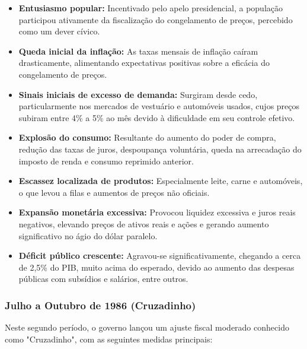 \documentclass[a4paper,12pt]{article}[abntex2]
\begin{document}
\begin{itemize}
    \item \textbf{Entusiasmo popular:} Incentivado pelo apelo presidencial, a população participou ativamente da fiscalização do congelamento de preços, percebido como um dever cívico.
    \item \textbf{Queda inicial da inflação:} As taxas mensais de inflação caíram drasticamente, alimentando expectativas positivas sobre a eficácia do congelamento de preços.
    \item \textbf{Sinais iniciais de excesso de demanda:} Surgiram desde cedo, particularmente nos mercados de vestuário e automóveis usados, cujos preços subiram entre 4\% a 5\% ao mês devido à dificuldade em seu controle efetivo.
    \item \textbf{Explosão do consumo:} Resultante do aumento do poder de compra, redução das taxas de juros, despoupança voluntária, queda na arrecadação do imposto de renda e consumo reprimido anterior.
    \item \textbf{Escassez localizada de produtos:} Especialmente leite, carne e automóveis, o que levou a filas e aumentos de preços não oficiais.
    \item \textbf{Expansão monetária excessiva:} Provocou liquidez excessiva e juros reais negativos, elevando preços de ativos reais e ações e gerando aumento significativo no ágio do dólar paralelo.
    \item \textbf{Déficit público crescente:} Agravou-se significativamente, chegando a cerca de 2,5\% do PIB, muito acima do esperado, devido ao aumento das despesas públicas com subsídios e salários, entre outros.
\end{itemize}

\subsubsection{\textbf{Julho a Outubro de 1986 (Cruzadinho)}}

Neste segundo período, o governo lançou um ajuste fiscal moderado conhecido como "Cruzadinho", com as seguintes medidas principais:
\end{document}
